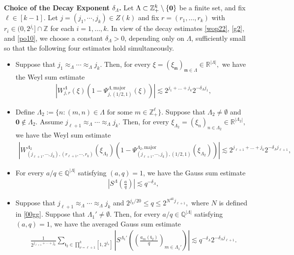 \documentclass[10pt,a4paper]{amsart}
\numberwithin{equation}{section}
\begin{document}
 
\noindent\textbf{Choice of the Decay Exponent $\delta_{\Lambda}$.}
	Let $\Lambda\subset \mathbb{Z}_+^k \setminus \{{\bf 0}\}$ be a finite set, and fix $ \ell \in  [k-1]$.    Let $j=(j_1,\cdots,j_k) \in Z(k) $ and  fix $r = (r_1, \dots, r_k)$ with $r_i \in (0, 2^{j_i}] \cap \mathbb{Z}$ for each $i = 1, \dots, k$. In view of the decay estimates \eqref{wop22}, \eqref{g2}, and \eqref{po10}, we choose a constant $\delta_{\Lambda}>0$, depending only on $\Lambda$, sufficiently small so that the following four estimates hold simultaneously.
	\begin{itemize}
		\item[(1)] Suppose that $j_1 \approx_{\Lambda} \cdots \approx_{\Lambda} j_k.$ Then, for every $\xi=(\xi_{\mathfrak{m}})_{\mathfrak{m}\in\Lambda} \in \mathbb{R}^{|\Lambda|},$ we have the Weyl sum estimate \begin{align}\label{weyl}
			\left| W_{j,r}^{\Lambda}(\xi) \left( 1 - \Psi_{j,(1/2,1)}^{\Lambda,\mathrm{major}}(\xi) \right) \right| \lesssim 2^{j_1 + \dots + j_k} 2^{-\delta_{\Lambda} j_1},
		\end{align}
		\item[(2)] Define $\Lambda_{2}:=\{n: (m,n)\in \Lambda\text{ for some } m\in\mathbb{Z}_{+}^{\ell}\}.$  Suppose that $\Lambda_2\neq \emptyset$ and $\textbf{0}\notin \Lambda_2.$ Assume  $j_{\ell+1} \approx_{\Lambda} \cdots \approx_{\Lambda} j_k.$  Then, for every $\xi_{\Lambda_2}=(\xi_{n})_{n\in\Lambda_2} \in \mathbb{R}^{|\Lambda_2|},$ we have the Weyl sum estimate \begin{align}\label{weyl1}
			\left| W_{(j_{\ell+1},\cdots,j_{k}),(r_{\ell+1},\cdots,r_{k})}^{\Lambda_2}(\xi_{\Lambda_2}) \left( 1 - \Psi_{(j_{\ell+1},\cdots,j_{k}),(1/2,1)}^{\Lambda_2,\mathrm{major}}(\xi_{\Lambda_2}) \right) \right| \lesssim 2^{j_{\ell+1} + \dots + j_k} 2^{-\delta_{\Lambda} j_{\ell+1}},
		\end{align}
		\item[(3)] For every $a/q\in\mathbb{Q}^{|\Lambda|}$ satisfying $(a,q)=1$, we have the Gauss sum estimate \begin{align}\label{gaus}
			\left|S^{\Lambda}\!\left(\frac{a}{q}\right)\right|
			\lesssim q^{-\delta_{\Lambda}},
		\end{align}
		\item[(4)] Suppose that $j_{\ell+1} \approx_{\Lambda} \cdots \approx_{\Lambda} j_k$ and $ 2^{j_k/20} \le q \le 2^{N^{4k}j_{\ell+1}},$ where $N$  is defined in \eqref{00gg}. Suppose that $\Lambda_1'\neq \emptyset$. Then, for every $a/q\in\mathbb{Q}^{|\Lambda|}$ satisfying $(a,q)=1$, we have the averaged Gauss sum estimate \begin{align}\label{aver}
			\frac{1}{ 2^{j_{\ell+1} +\cdots+ j_k}       } \sum_{\mathfrak{t}_2\in \prod_{\nu=\ell+1}^k [1,2^{j_\nu}] }  \left|S^{\Lambda_{1}'}\left(\left( \frac{a_{m}(\mathfrak{t}_2)}{q} \right)_{m\in \Lambda_{1}'}\right) \right|\lesssim q^{-\delta_{\Lambda}}2^{-\delta_{\Lambda} j_{\ell+1}}.
		\end{align}
	\end{itemize}
\end{document}
